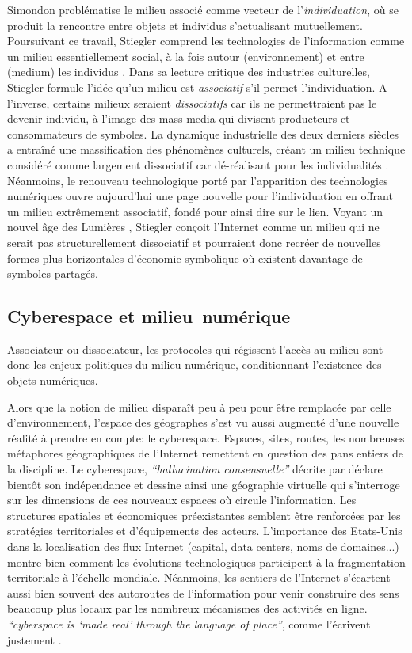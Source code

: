 Simondon problématise le milieu associé comme vecteur de l’\textit{individuation}, où se produit la rencontre entre objets et individus s'actualisant mutuellement. Poursuivant ce travail, Stiegler comprend les technologies de l’information comme un milieu essentiellement social, à la fois autour (environnement) et entre (medium) les individus \citep{Stiegler1998a}. Dans sa lecture critique des industries culturelles, Stiegler formule l’idée qu’un milieu est \textit{associatif} s’il permet l’individuation. A l’inverse, certains milieux seraient \textit{dissociatifs} car ils ne permettraient pas le devenir individu, à l’image des mass media qui divisent producteurs et consommateurs de symboles. La dynamique industrielle des deux derniers siècles a entraîné une massification des phénomènes culturels, créant un milieu technique considéré comme largement dissociatif car dé-réalisant pour les individualités \citep{Simondon1989}. Néanmoins, le renouveau technologique porté par l’apparition des technologies numériques ouvre aujourd’hui une page nouvelle pour l’individuation en offrant un milieu extrêmement associatif, fondé pour ainsi dire sur le lien. Voyant un nouvel âge des Lumières \citep{Stiegler2012}, Stiegler conçoit l’Internet comme un milieu qui ne serait pas structurellement dissociatif et pourraient donc recréer de nouvelles formes plus horizontales d’économie symbolique où existent davantage de symboles partagés. 

\subsection[Cyberespace et milieu numérique]{Cyberespace et milieu numérique}

Associateur ou dissociateur, les protocoles qui régissent l’accès au milieu sont donc les enjeux politiques du milieu numérique, conditionnant l’existence des objets numériques. 

Alors que la notion de milieu disparaît peu à peu pour être remplacée par celle d’environnement\citep{DAngio2001}, l’espace des géographes s'est vu aussi augmenté d’une nouvelle réalité à prendre en compte: le cyberespace. Espaces, sites, routes, les nombreuses métaphores géographiques de l'Internet remettent en question des pans entiers de la discipline. Le cyberespace, \textit{``hallucination consensuelle''} décrite par \cite{Gibson1984} déclare bientôt son indépendance \citep{Barlow2001} et dessine ainsi une géographie virtuelle \citep{Batty1997} qui s’interroge sur les dimensions de ces nouveaux espaces où circule l’information. Les structures spatiales et économiques préexistantes semblent être renforcées par les stratégies territoriales et d'équipements des acteurs. L’importance des Etats-Unis \citep{Zook2001, Cukier1999} dans la localisation des flux Internet (capital, data centers, noms de domaines...) montre bien comment les évolutions technologiques participent à la fragmentation territoriale à l’échelle mondiale. Néanmoins, les sentiers de l’Internet s’écartent aussi bien souvent des autoroutes de l’information pour venir construire des sens beaucoup plus locaux par les nombreux mécanismes des activités en ligne. \textit{``cyberspace is ‘made real’ through the language of place''}, comme l’écrivent justement \cite{Dodge2007}.

